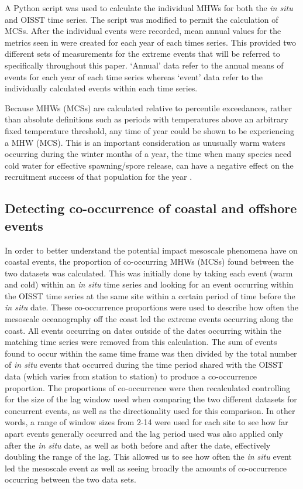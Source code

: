 \documentclass[a4paper,10pt,review]{elsarticle}
\begin{document}
A Python script \citep[https://github.com/ecjoliver/marineHeatWaves; see][]{Hobday2016} was used to calculate the individual MHWs for both the \emph{in situ} and OISST time series. The script was modified to permit the calculation of MCSs. After the individual events were recorded, mean annual values for the metrics seen in  were created for each year of each times series. This provided two different sets of measurements for the extreme events that will be referred to specifically throughout this paper. `Annual' data refer to the annual means of events for each year of each time series whereas `event' data refer to the individually calculated events within each time series.

Because MHWs (MCSs) are calculated relative to percentile exceedances, rather than absolute definitions such as periods with temperatures above an arbitrary fixed temperature threshold, any time of year could be shown to be experiencing a MHW (MCS). This is an important consideration as unusually warm waters occurring during the winter months of a year, the time when many species need cold water for effective spawning/spore release, can have a negative effect on the recruitment success of that population for the year \citep{Wernberg2011}.

\subsection{Detecting co-occurrence of coastal and offshore events}
In order to better understand the potential impact mesoscale phenomena have on coastal events, the proportion of co-occurring MHWs (MCSs) found between the two datasets was calculated. This was initially done by taking each event (warm and cold) within an \emph{in situ} time series and looking for an event occurring within the OISST time series at the same site within a certain period of time before the \emph{in situ} date. These co-occurrence proportions were used to describe how often the mesoscale oceanography off the coast led the extreme events occurring along the coast. All events occurring on dates outside of the dates occurring within the matching time series were removed from this calculation. The sum of events found to occur within the same time frame was then divided by the total number of \emph{in situ} events that occurred during the time period shared with the OISST data (which varies from station to station) to produce a co-occurrence proportion. The proportions of co-occurrence were then recalculated controlling for the size of the lag window used when comparing the two different datasets for concurrent events, as well as the directionality used for this comparison. In other words, a range of window sizes from 2-14 were used for each site to see how far apart events generally occurred and the lag period used was also applied only after the \emph{in situ} date, as well as both before and after the date, effectively doubling the range of the lag. This allowed us to see how often the \emph{in situ} event led the mesoscale event as well as seeing broadly the amounts of co-occurrence occurring between the two data sets.
\end{document}
